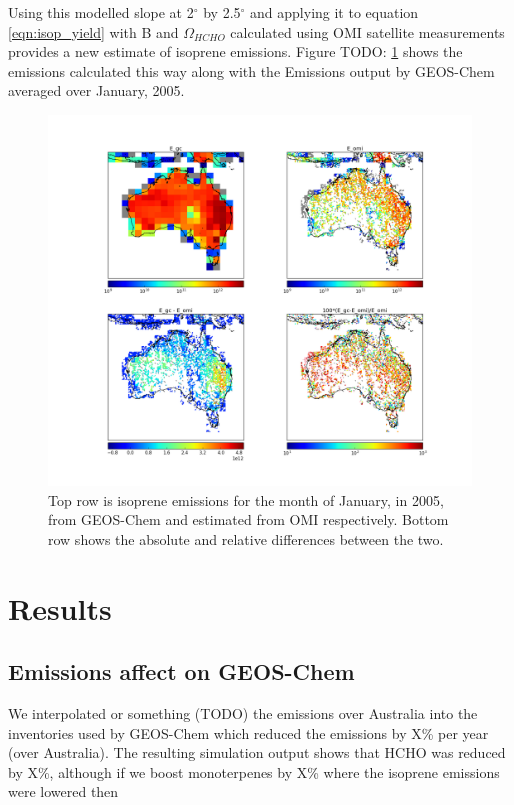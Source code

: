 \documentclass[acp, manuscript]{copernicus} %
\begin{document}
    Using this modelled slope at 2$^{\circ}$ by 2.5$^{\circ}$ and applying it to equation \ref{eqn:isop_yield} with B and $\Omega_{HCHO}$ calculated using OMI satellite measurements provides a new estimate of isoprene emissions.
    Figure TODO: \ref{fig:E_isop_200501} shows the emissions calculated this way along with the Emissions output by GEOS-Chem averaged over January, 2005.
    
    \begin{figure}[!htbp]
      \includegraphics[width=\textwidth]{figures/E_Comparison.png}
      \caption{%
	Top row is isoprene emissions for the month of January, in 2005, from GEOS-Chem and estimated from OMI respectively.
	Bottom row shows the absolute and relative differences between the two.
      }
      \label{fig:E_isop_200501}
    \end{figure}
    
    
\section{Results}
  
  \subsection{Emissions affect on GEOS-Chem}
    We interpolated or something (TODO) the emissions over Australia into the inventories used by GEOS-Chem which reduced the emissions by X\% per year (over Australia).
    The resulting simulation output shows that HCHO was reduced by X\%, although if we boost monoterpenes by X\% where the isoprene emissions were lowered then 
    
\end{document}
